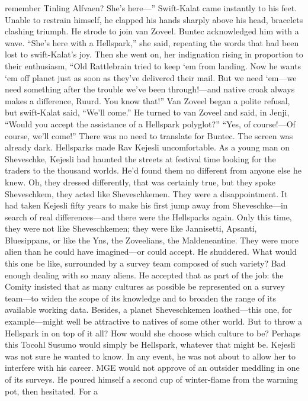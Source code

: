 \documentclass[9pt]{article}
\begin{document}
remember Tinling Alfvaen? She’s here—”
Swift-Kalat came instantly to his feet. Unable to restrain himself, he clapped his hands sharply above
his head, bracelets clashing triumph. He strode to join van Zoveel.
Buntec acknowledged him with a wave. “She’s here with a Hellspark,” she said, repeating the words
that had been lost to swift-Kalat’s joy. Then she went on, her indignation rising in proportion to their
enthusiasm, “Old Rattlebrain tried to keep ‘em from landing. Now he wants ‘em off planet just as soon
as they’ve delivered their mail. But we need ‘em—we need something after the trouble we’ve been
through!—and native croak always makes a difference, Ruurd. You know that!”
Van Zoveel began a polite refusal, but swift-Kalat said, “We’ll come.” He turned to van Zoveel and
said, in Jenji, “Would you accept the assistance of a Hellspark polyglot?”
“Yes, of course!—Of course, we’ll come!” There was no need to translate for Buntec. The screen
was already dark.
Hellsparks made Rav Kejesli uncomfortable.
As a young man on Sheveschke, Kejesli had haunted the streets at festival time looking for the
traders to the thousand worlds. He’d found them no different from anyone else he knew. Oh, they
dressed differently, that was certainly true, but they spoke Sheveschkem, they acted like
Sheveschkemen. They were a disappointment.
It had taken Kejesli fifty years to make his first jump away from Sheveschke—in search of real
differences—and there were the Hellsparks again. Only this time, they were not like Sheveschkemen;
they were like Jannisetti, Apsanti, Bluesippans, or like the Yns, the Zoveelians, the Maldeneantine. They
were more alien than he could have imagined—or could accept.
He shuddered. What would this one be like, surrounded by a survey team composed of such
variety?
Bad enough dealing with so many aliens. He accepted that as part of the job: the Comity insisted that
as many cultures as possible be represented on a survey team—to widen the scope of its knowledge and
to broaden the range of its available working data. Besides, a planet Sheveschkemen loathed—this one,
for example—might well be attractive to natives of some other world.
But to throw a Hellspark in on top of it all? How would she choose which culture to be?
Perhaps this Tocohl Susumo would simply be Hellspark, whatever that might be. Kejesli was not
sure he wanted to know.
In any event, he was not about to allow her to interfere with his career. MGE would not approve of
an outsider meddling in one of its surveys.
He poured himself a second cup of winter-flame from the warming pot, then hesitated. For a
\end{document}
